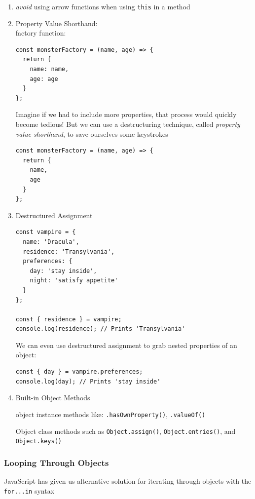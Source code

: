 \documentclass[a4paper, 12pt]{article}
\begin{document}
\begin{enumerate}
\item \textit{avoid} using arrow functions when using \verb|this| in a method

\item Property Value Shorthand:\\
factory function:
\begin{verbatim}
const monsterFactory = (name, age) => {
  return { 
    name: name,
    age: age
  }
};
\end{verbatim}

Imagine if we had to include more properties, that process would quickly become tedious! But we can use a destructuring technique, called \textit{property value shorthand}, to save ourselves some keystrokes
\begin{verbatim}
const monsterFactory = (name, age) => {
  return { 
    name,
    age 
  }
};
\end{verbatim}

\item Destructured Assignment
\begin{verbatim}
const vampire = {
  name: 'Dracula',
  residence: 'Transylvania',
  preferences: {
    day: 'stay inside',
    night: 'satisfy appetite'
  }
};

const { residence } = vampire; 
console.log(residence); // Prints 'Transylvania'
\end{verbatim}
We can even use destructured assignment to grab nested properties of an object:
\begin{verbatim}
const { day } = vampire.preferences; 
console.log(day); // Prints 'stay inside'
\end{verbatim}

\item Built-in Object Methods

object instance methods like: \verb|.hasOwnProperty()|, \verb|.valueOf()|

Object class methods such as \verb|Object.assign()|, \verb|Object.entries()|, and\\ \verb|Object.keys()|

\end{enumerate}

\subsubsection{Looping Through Objects}
JavaScript has given us alternative solution for iterating through objects with the \verb|for...in| syntax
\end{document}
